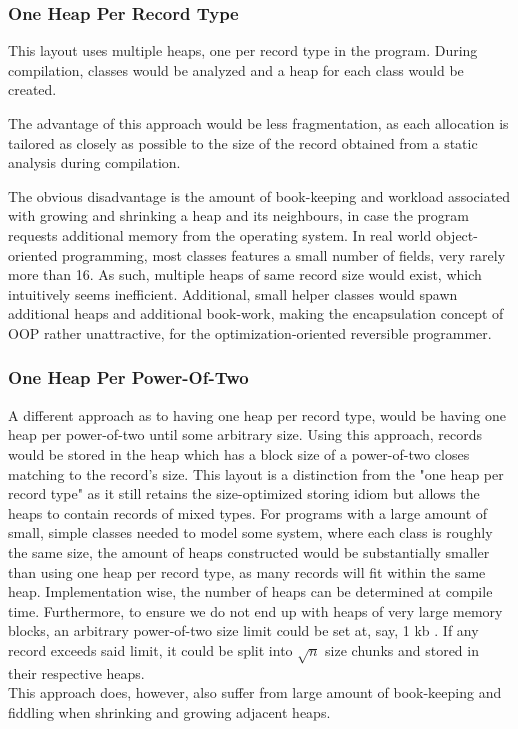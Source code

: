 

\subsubsection{One Heap Per Record Type}
This layout uses multiple heaps, one per record type in the program. During compilation, classes would be analyzed and a heap for each class would be created. 

The advantage of this approach would be less fragmentation, as each allocation is tailored as closely as possible to the size of the record obtained from a static analysis during compilation.

The obvious disadvantage is the amount of book-keeping and workload associated with growing and shrinking a heap and its neighbours, in case the program requests additional memory from the operating system. In real world object-oriented programming, most classes features a small number of fields, very rarely more than 16. As such, multiple heaps of same record size would exist, which intuitively seems inefficient. Additional, small helper classes would spawn additional heaps and additional book-work, making the encapsulation concept of OOP rather unattractive, for the optimization-oriented reversible programmer.



\subsubsection{One Heap Per Power-Of-Two}
A different approach as to having one heap per record type, would be having one heap per power-of-two until some arbitrary size. Using this approach, records would be stored in the heap which has a block size of a power-of-two closes matching to the record's size. This layout is a distinction from the "one heap per record type" as it still retains the size-optimized storing idiom but allows the heaps to contain records of mixed types. For programs with a large amount of small, simple classes needed to model some system, where each class is roughly the same size, the amount of heaps constructed would be substantially smaller than using one heap per record type, as many records will fit within the same heap. Implementation wise, the number of heaps can be determined at compile time. Furthermore, to ensure we do not end up with heaps of very large memory blocks, an arbitrary power-of-two size limit could be set at, say, 1 kb . If any record exceeds said limit, it could be split into $\sqrt{n}$ size chunks and stored in their respective heaps.\\
This approach does, however, also suffer from large amount of book-keeping and fiddling when shrinking and growing adjacent heaps.

